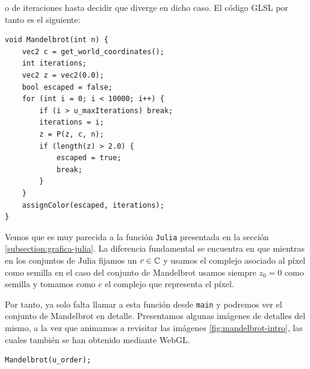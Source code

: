 o de iteraciones hasta decidir que diverge en dicho caso. El código GLSL por tanto es el siguiente:

\begin{lstlisting}
void Mandelbrot(int n) {
    vec2 c = get_world_coordinates();
    int iterations;
    vec2 z = vec2(0.0);
    bool escaped = false;
    for (int i = 0; i < 10000; i++) {
        if (i > u_maxIterations) break;
        iterations = i;
        z = P(z, c, n);
        if (length(z) > 2.0) {
            escaped = true;
            break;
        }
    }
    assignColor(escaped, iterations);    
}
\end{lstlisting}

Vemos que es muy parecida a la función \verb|Julia| presentada en la sección \ref{subsection:grafica-julia}. La diferencia fundamental se encuentra en que mientras en los conjuntos de Julia fijamos un $c\in\mathbb{C}$ y usamos el complejo asociado al píxel como semilla en el caso del conjunto de Mandelbrot usamos siempre $z_0=0$ como semilla y tomamos como $c$ el complejo que representa el píxel.

Por tanto, ya solo falta llamar a esta función desde \verb|main| y podremos ver el conjunto de Mandelbrot en detalle. Presentamos algunas imágenes de detalles del mismo, a la vez que animamos a revisitar las imágenes \ref{fig:mandelbrot-intro}, las cuales también se han obtenido mediante WebGL.

\begin{lstlisting}
Mandelbrot(u_order);
\end{lstlisting}

